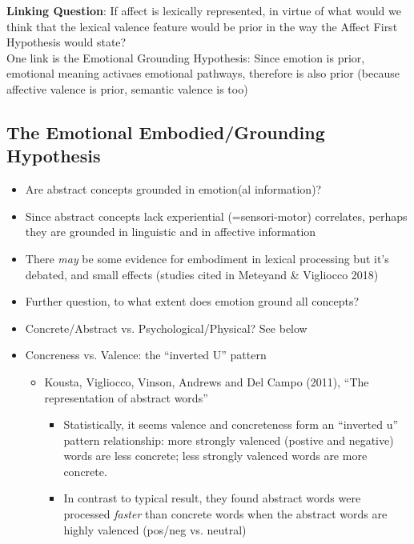 \documentclass[12pt,letterpaper,table,svgnames,dvipsnames]{article}
\begin{document}
\noindent \textbf{Linking Question}: If affect is lexically represented, in virtue of what would we think that the lexical valence feature would be prior in the way the Affect First Hypothesis would state?\\


\noindent One link is the Emotional Grounding Hypothesis: Since emotion is prior, emotional meaning activaes emotional pathways, therefore is also prior (because affective valence is prior, semantic valence is too)


\subsection{The Emotional Embodied/Grounding Hypothesis}


\begin{itemize}
    \item Are abstract concepts grounded in emotion(al information)?

    \item Since abstract concepts lack experiential (=sensori-motor) correlates, perhaps they are grounded in linguistic and in affective information

    \item There \emph{may} be some evidence for embodiment in lexical processing but it's debated, and small effects (studies cited in Meteyand \& Vigliocco 2018)

    \item Further question, to what extent does emotion ground all concepts? 
    

    \item Concrete/Abstract vs. Psychological/Physical? See below


    \item Concreness vs. Valence: the ``inverted U'' pattern
        \begin{itemize}
            \item Kousta, Vigliocco, Vinson, Andrews and Del Campo (2011), ``The representation of abstract words''
                \begin{itemize}
                    \item Statistically, it seems valence and concreteness form an ``inverted u'' pattern relationship: more strongly valenced (postive and negative) words are less concrete; less strongly valenced words are more concrete.

                    \item In contrast to typical result, they found abstract words were processed \emph{faster} than concrete words when the abstract words are highly valenced (pos/neg vs. neutral)
                \end{itemize}


\end{itemize}
\end{itemize}
\end{document}
